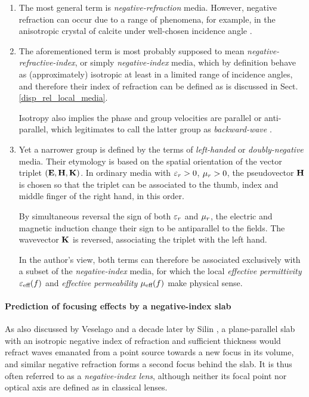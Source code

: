 \begin{enumerate}
\item{The most general term is \textit{negative-refraction} media. %
	However, negative refraction can occur due to a range of phenomena, for example, in the anisotropic crystal of calcite under well-chosen incidence angle \cite{agranovich2006spatial}.} 
\item{The aforementioned term is most probably supposed to mean \textit{negative-refractive-index}, or simply \textit{negative-index} media, which by definition behave as (approximately) isotropic at least in a limited range of incidence angles, and therefore their index of refraction can be defined as is discussed in Sect. \ref{disp_rel_local_media}. 
	
Isotropy also implies the phase and group velocities are parallel or anti-parallel, which legitimates to call the latter group as \textit{backward-wave} \cite{lindell2001bw}.} 

\item{Yet a narrower group is defined by the terms of \textit{left-handed} \cite{veselago1968} or \textit{doubly-negative} media. Their etymology is based on the spatial orientation of the vector triplet $(\mathbf{E}, \mathbf{H}, {\mathbf{K}})$. In ordinary media with $\varepsilon_r > 0$, $\mu_r > 0$, the pseudovector $\mathbf{H}$ is chosen so that the triplet can be associated to the thumb, index and middle finger of the right hand, in this order. 

By simultaneous reversal the sign of both $\varepsilon_r$ and $\mu_r$, the electric and magnetic induction change their sign to be antiparallel to the fields. The wavevector ${\mathbf{K}}$ is reversed, associating the triplet with the left hand. 

In the author's view, both terms can therefore be associated exclusively with a subset of the \textit{negative-index} media, for which the local \textit{effective permittivity} $\varepsilon_{\text{eff} }(f)$ and \textit{effective permeability} $\mu_{\text{eff} }(f)$ make physical sense. %
}
\end{enumerate}

\paragraph{Prediction of focusing effects by a negative-index slab} %
As also discussed by Veselago \cite[p. 511]{veselago1968} and a decade later by Silin \cite{silin1978possibility},  %
a plane-parallel slab with an isotropic negative index of refraction and sufficient thickness would refract waves emanated from a point source towards a new focus in its volume, and similar negative refraction forms a second focus behind the slab. It is thus often referred to as a \textit{negative-index lens}, although neither its focal point nor optical axis are defined as in classical lenses.

